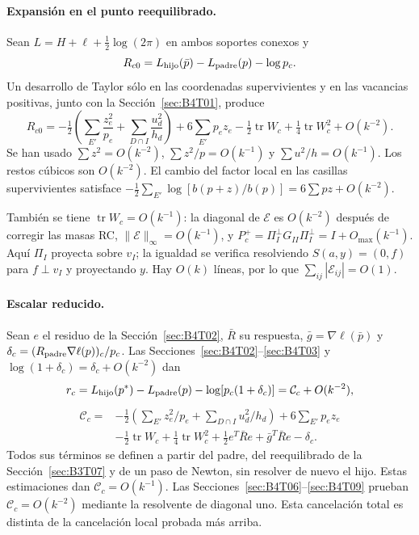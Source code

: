 \paragraph{Expansión en el punto reequilibrado.}
Sean $L=H+\ell+\tfrac12\log(2\pi)$ en ambos soportes conexos y
\[
 R_{c0}=L_{\rm hijo}(\bar p)-L_{\rm padre}(p)-\log p_c.
\]
Un desarrollo de Taylor sólo en las coordenadas supervivientes y en las vacancias positivas,
junto con la Sección~\ref{sec:B4T01}, produce
\[
 \boxed{R_{c0}=-\tfrac12\left(\sum_{E'}\frac{z_e^2}{p_e}
                  +\sum_{D\cap I}\frac{u_d^2}{h_d}\right)
 +6\sum_{E'}p_ez_e-\tfrac12\operatorname{tr}W_c
 +\tfrac14\operatorname{tr}W_c^2+O(k^{-2}).}
\]
Se han usado $\sum z^2=O(k^{-2})$, $\sum z^2/p=O(k^{-1})$ y
$\sum u^2/h=O(k^{-1})$. Los restos cúbicos son $O(k^{-2})$.
El cambio del factor local en las casillas supervivientes satisface
$-\tfrac12\sum_{E'}\log[b(p+z)/b(p)]=6\sum pz+O(k^{-2})$.

También se tiene $\operatorname{tr}W_c=O(k^{-1})$:
la diagonal de $\mathcal E$ es $O(k^{-2})$ después de corregir las masas RC,
$\|\mathcal E\|_\infty=O(k^{-1})$, y
$P_c^+=\Pi_I^\perp G_{II}\Pi_I^\perp=I+O_{\max}(k^{-1})$.
Aquí $\Pi_I$ proyecta sobre $v_I$; la igualdad se verifica resolviendo
$S(a,y)=(0,f)$ para $f\perp v_I$ y proyectando $y$.
Hay $O(k)$ líneas, por lo que $\sum_{ij}|\mathcal E_{ij}|=O(1)$.

\paragraph{Escalar reducido.}
Sean $e$ el residuo de la Sección~\ref{sec:B4T02}, $\bar R$ su respuesta, $\bar g=\nabla\ell(\bar p)$
y $\delta_c=(R_{\rm padre}\nabla\ell(p))_c/p_c$.
Las Secciones~\ref{sec:B4T02}--\ref{sec:B4T03} y $\log(1+\delta_c)=\delta_c+O(k^{-2})$ dan
\begin{equation}\label{eq:rc}
 r_c=L_{\rm hijo}(p^*)-L_{\rm padre}(p)-\log[p_c(1+\delta_c)]
       =\mathcal C_c+O(k^{-2}),
\end{equation}
\begin{equation}\label{eq:Cc}
 \boxed{\begin{aligned}
 \mathcal C_c={}&-\tfrac12\left(\sum_{E'}z_e^2/p_e+
                                \sum_{D\cap I}u_d^2/h_d\right)
 +6\sum_{E'}p_ez_e\\
 &-\tfrac12\operatorname{tr}W_c+\tfrac14\operatorname{tr}W_c^2
 +\tfrac12e^T\bar R e+\bar g^T\bar R e-\delta_c.
 \end{aligned}}
\end{equation}
Todos sus términos se definen a partir del padre, del reequilibrado de la Sección~\ref{sec:B3T07} y
de un paso de Newton, sin resolver de nuevo el hijo. Estas estimaciones dan
$\mathcal C_c=O(k^{-1})$. Las Secciones~\ref{sec:B4T06}--\ref{sec:B4T09} prueban
$\mathcal C_c=O(k^{-2})$ mediante la resolvente de diagonal uno.
Esta cancelación total es distinta de la cancelación local probada más arriba.

